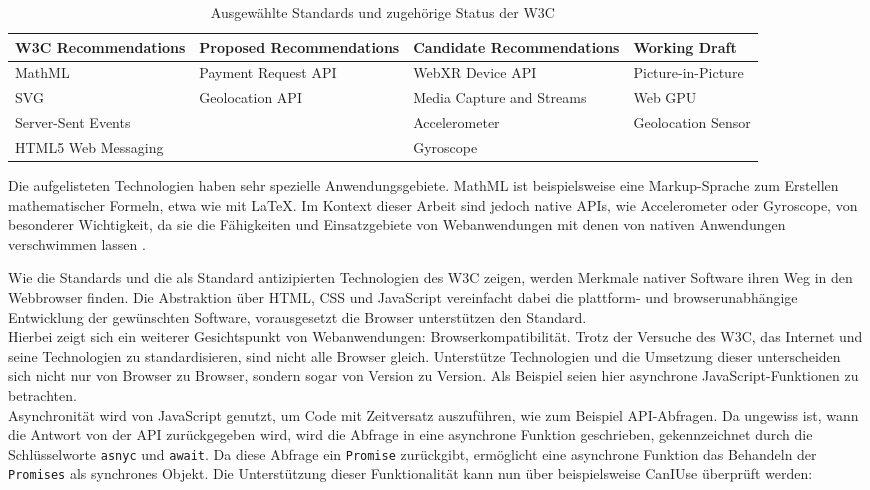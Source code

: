 \documentclass[a4paper]{scrartcl}
\begin{document}
\begin{table}[H]
	\caption{Ausgewählte Standards und zugehörige Status der W3C}
	\begin{center}
		\begin{tabularx}{\linewidth}{| Y | Y | Y | Y |}
			\hline
			\textbf{W3C Recommendations} & \textbf{Proposed Recommendations} & \textbf{Candidate Recommendations} & \textbf{Working Draft} \\
			\hline \hline
			MathML & Payment Request API & WebXR Device API & Picture-in-Picture \\
			\hline
			SVG & Geolocation API & Media Capture and Streams & Web GPU \\
			\hline
			Server-Sent Events & & Accelerometer & Geolocation Sensor \\
			\hline
			HTML5 Web Messaging & & Gyroscope & \\
			\hline
		\end{tabularx}
	\end{center}
	\justifying
	\small	
	Die aufgelisteten Technologien haben sehr spezielle Anwendungsgebiete. MathML ist beispielsweise eine Markup-Sprache zum Erstellen mathematischer Formeln, etwa wie mit \LaTeX. Im Kontext dieser Arbeit sind jedoch native APIs, wie Accelerometer oder Gyroscope, von besonderer Wichtigkeit, da sie die Fähigkeiten und Einsatzgebiete von Webanwendungen mit denen von nativen Anwendungen verschwimmen lassen \autocite{W3C}.
\end{table}

Wie die Standards und die als Standard antizipierten Technologien des W3C zeigen, werden Merkmale nativer Software ihren Weg in den Webbrowser finden. Die Abstraktion über HTML, CSS und JavaScript vereinfacht dabei die plattform- und browserunabhängige Entwicklung der gewünschten Software, vorausgesetzt die Browser unterstützen den Standard. \\

Hierbei zeigt sich ein weiterer Gesichtspunkt von Webanwendungen: Browserkompatibilität. Trotz der Versuche des W3C, das Internet und seine Technologien zu standardisieren, sind nicht alle Browser gleich. Unterstütze Technologien und die Umsetzung dieser unterscheiden sich nicht nur von Browser zu Browser, sondern sogar von Version zu Version. Als Beispiel seien hier asynchrone JavaScript-Funktionen zu betrachten. \\
 Asynchronität wird von JavaScript genutzt, um Code mit Zeitversatz auszuführen, wie zum Beispiel API-Abfragen. Da ungewiss ist, wann die Antwort von der API zurückgegeben wird, wird die Abfrage in eine asynchrone Funktion geschrieben, gekennzeichnet durch die Schlüsselworte \texttt{asnyc} und \texttt{await}. Da diese Abfrage ein \texttt{Promise} zurückgibt, ermöglicht eine asynchrone Funktion das Behandeln der \texttt{Promises} als synchrones Objekt. Die Unterstützung dieser Funktionalität kann nun über beispielsweise CanIUse überprüft werden: 
 
\end{document}
